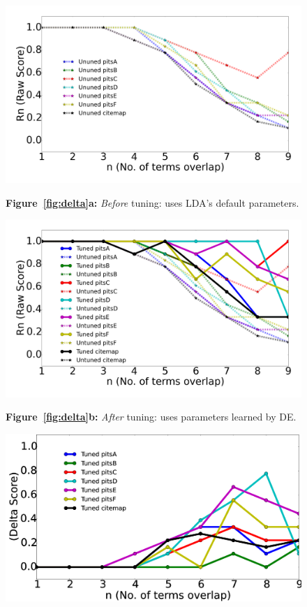 \documentclass[10pt,conference]{IEEEtran}
\theoremstyle{break}
\begin{document}
\begin{figure}[!t]
  \begin{center}
  \includegraphics[width=\linewidth]{./fig/Vem_untuned.png}

  {\bf Figure~\ref{fig:delta}a:}  {\em Before} tuning: uses LDA's default parameters.

  \includegraphics[width=\linewidth]{./fig/raw_graph.png}

  {\bf Figure~\ref{fig:delta}b:}  {\em After} tuning: uses parameters learned by DE.

  

  \includegraphics[width=\linewidth]{./fig/tuned_delta_vem.png}


\end{center}
\end{figure}
\end{document}
